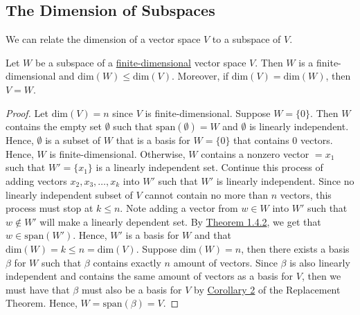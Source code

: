 \subsection{The Dimension of Subspaces}

We can relate the dimension of a vector space \( V  \) to a subspace of \( V  \).

\begin{theorem}[ ]
    Let \( W  \) be a subspace of a {\hyperref[Finite-dimensional]{finite-dimensional}} vector space \( V  \). Then \( W  \) is a finite-dimensional and \( \text{dim}(W) \leq \text{dim}(V) \). Moreover, if \( \text{dim}(V) = \text{dim}(W) \), then \( V = W  \).
\end{theorem}
\begin{proof}
    Let \( \text{dim}(V) = n  \) since \( V \) is finite-dimensional. Suppose \( W = \{ 0  \}  \). Then \( W  \) contains the empty set \( \emptyset \) such that \( \text{span}(\emptyset) = W  \) and \( \emptyset \) is linearly independent. Hence, \( \emptyset \) is a subset of \( W  \) that is a basis for \( W = \{ 0 \}  \) that contains \( 0  \) vectors. Hence, \( W  \) is finite-dimensional. Otherwise, \( W  \) contains a nonzero vector \( =  x_{1}  \) such that \(W' =  \{ x_{1} \}  \) is a linearly independent set. Continue this process of adding vectors \( x_{2}, x_{3} , \dots, x_{k } \) into \( W' \) such that \( W'  \) is linearly independent. Since no linearly independent subset of \( V  \) cannot contain no more than \( n \) vectors, this process must stop at \( k \leq  n \). Note adding a vector from \(w \in W  \) into \( W' \) such that \(w \notin W' \) will make a linearly dependent set. By {\hyperref[Theorem 1.7]{Theorem 1.4.2}}, we get that \( w \in \text{span}(W') \). Hence, \( W'  \) is a basis for \( W  \) and that \( \text{dim}(W) = k  \leq n = \text{dim}(V) \).
    Suppose \( \text{dim}(W) = n  \), then there exists a basis \( \beta \) for \( W  \)   such that \( \beta \) contains exactly \( n \) amount of vectors. Since \( \beta \) is also linearly independent and contains the same amount of vectors as a basis for \( V  \), then we must have that \( \beta \) must also be a basis for \( V  \) by {\hyperref[2nd Corollary to RT]{Corollary 2}} of the Replacement Theorem. Hence, \( W = \text{span}(\beta) = V  \). 
\end{proof}

